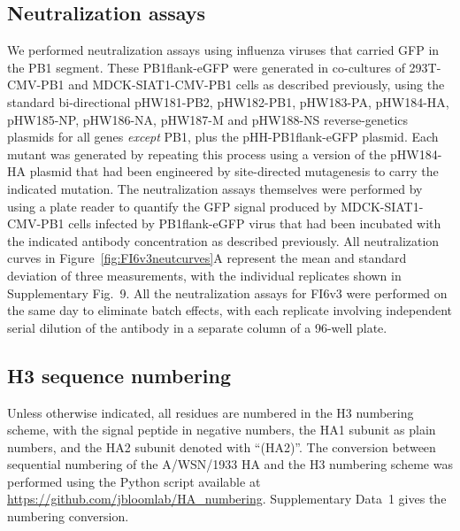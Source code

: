 \documentclass[11pt]{article}
\begin{document}
\subsection*{Neutralization assays}
We performed neutralization assays using influenza viruses that carried GFP in the PB1 segment.
These PB1flank-eGFP were generated in co-cultures of 293T-CMV-PB1 and MDCK-SIAT1-CMV-PB1 cells as described previously\cite{bloom2010permissive}, using the standard bi-directional pHW181-PB2, pHW182-PB1, pHW183-PA, pHW184-HA, pHW185-NP, pHW186-NA, pHW187-M and pHW188-NS reverse-genetics plasmids\cite{hoffmann2000dna} for all genes \emph{except} PB1, plus the pHH-PB1flank-eGFP plasmid\cite{bloom2010permissive}.
Each mutant was generated by repeating this process using a version of the pHW184-HA plasmid that had been engineered by site-directed mutagenesis to carry the indicated mutation.
The neutralization assays themselves were performed by using a plate reader to quantify the GFP signal produced by MDCK-SIAT1-CMV-PB1 cells infected by PB1flank-eGFP virus that had been incubated with the indicated antibody concentration as described previously\cite{hooper2013mutant}.
All neutralization curves in Figure~\ref{fig:FI6v3neutcurves}A represent the mean and standard deviation of three measurements, with the individual replicates shown in Supplementary Fig.~9.
All the neutralization assays for FI6v3 were performed on the same day to eliminate batch effects, with each replicate involving independent serial dilution of the antibody in a separate column of a 96-well plate. 

\subsection*{H3 sequence numbering}
Unless otherwise indicated, all residues are numbered in the H3 numbering scheme, with the signal peptide in negative numbers, the HA1 subunit as plain numbers, and the HA2 subunit denoted with ``(HA2)''. 
The conversion between sequential numbering of the A/WSN/1933 HA and the H3 numbering scheme was performed using the Python script available at \url{https://github.com/jbloomlab/HA_numbering}.
Supplementary Data~1 gives the numbering conversion.  
\end{document}
